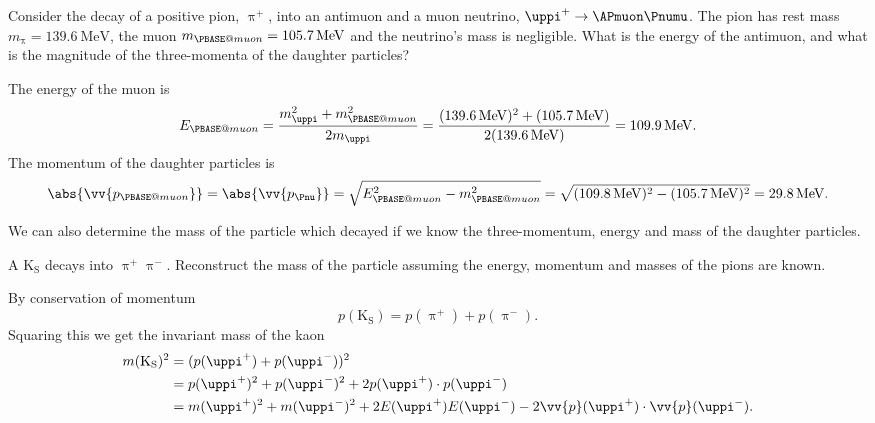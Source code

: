 \documentclass[fleqn]{NotesClass}
\makeatletter
\newcommand{\Pmuonneutral}{\ensuremath{\PBASE@muon}}
\newcommand{\PBASE@pion}{\uppi}
\newcommand{\Ppi}{\ensuremath{\PBASE@pion}}
\newcommand{\Ppiplus}{\ensuremath{\PBASE@pion^+}}
\newcommand{\Ppiminus}{\ensuremath{\PBASE@pion^-}}
\newcommand{\PBASE@kaon}{\mathrm{K}}
\newcommand{\PKshort}{\ensuremath{\PBASE@kaon_{\mathrm{S}}}}
\makeatother
\begin{document}
    \begin{exm}{}{}
        Consider the decay of a positive pion, \Ppiplus, into an antimuon and a muon neutrino, \(\Ppiplus \to \APmuon\Pnumu\).
        The pion has rest mass \(m_{\Ppi} = \qty{139.6}{\mega\electronvolt}\), the muon \(m_{\Pmuonneutral} = \qty{105.7}{\mega\electronvolt}\) and the neutrino's mass is negligible.
        What is the energy of the antimuon, and what is the magnitude of the three-momenta of the daughter particles?
        
        The energy of the muon is
        \begin{equation}
            E_{\Pmuonneutral} = \frac{m_{\Ppi}^2 + m_{\Pmuonneutral}^2}{2m_{\Ppi}} = \frac{(\qty{139.6}{\mega\electronvolt})^2 + (\qty{105.7}{\mega\electronvolt})}{2(\qty{139.6}{\mega\electronvolt})} = \qty{109.9}{\mega\electronvolt}.
        \end{equation}
        The momentum of the daughter particles is
        \begin{equation}
            \abs{\vv{p_{\Pmuonneutral}}} = \abs{\vv{p_{\Pnu}}} = \sqrt{E_{\Pmuonneutral}^2 - m_{\Pmuonneutral}^2} = \sqrt{(\qty{109.8}{\mega\electronvolt})^2 - (\qty{105.7}{\mega\electronvolt})^2} = \qty{29.8}{\mega\electronvolt}.
        \end{equation}
    \end{exm}
    
    We can also determine the mass of the particle which decayed if we know the three-momentum, energy and mass of the daughter particles.
    \begin{exm}{}{}
        A \PKshort{} decays into \Ppiplus\Ppiminus.
        Reconstruct the mass of the particle assuming the energy, momentum and masses of the pions are known.
        
        By conservation of momentum
        \begin{equation}
            p(\PKshort) = p(\Ppiplus) + p(\Ppiminus).
        \end{equation}
        Squaring this we get the invariant mass of the kaon
        \begin{align}
            m(\PKshort)^2 &= (p(\Ppiplus) + p(\Ppiminus))^2\\
            &= p(\Ppiplus)^2 + p(\Ppiminus)^2 + 2p(\Ppiplus) \cdot p(\Ppiminus)\\
            &= m(\Ppiplus)^2 + m(\Ppiminus)^2 + 2E(\Ppiplus)E(\Ppiminus) - 2\vv{p}(\Ppiplus)\cdot \vv{p}(\Ppiminus).
        \end{align}
    \end{exm}
    
\end{document}
